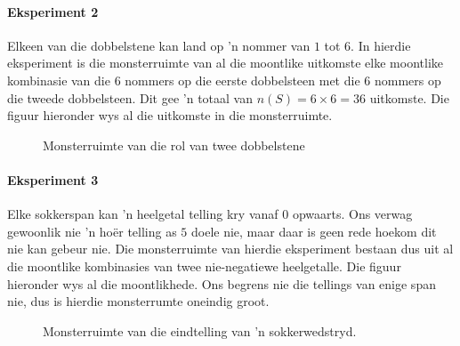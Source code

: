 \paragraph{Eksperiment 2} Elkeen van die dobbelstene kan land op 'n nommer van $1$ tot $6$. In hierdie eksperiment is die monsterruimte van al die moontlike uitkomste elke moontlike kombinasie van die $6$ nommers op die eerste dobbelsteen met die $6$ nommers op die tweede dobbelsteen. Dit gee 'n totaal van \(n(S) = 6 \times 6
= 36\) uitkomste. Die figuur hieronder wys al die uitkomste in die monsterruimte.

\begin{figure}[h]
\begin{center}
\end{center}
  \caption{Monsterruimte van die rol van twee dobbelstene}
\end{figure}

\paragraph{Eksperiment 3} Elke sokkerspan kan 'n heelgetal telling kry vanaf $0$ opwaarts. Ons verwag gewoonlik nie 'n ho\"er telling as $5$ doele nie, maar daar is geen rede hoekom dit nie kan gebeur nie. Die monsterruimte van hierdie eksperiment bestaan dus uit al die moontlike kombinasies van twee nie-negatiewe heelgetalle. Die figuur hieronder wys al die moontlikhede. Ons begrens nie die tellings van enige span nie, dus is hierdie monsterrumte oneindig groot.

\begin{figure}[h]
\begin{center}
\end{center}
  \caption{Monsterruimte van die eindtelling van 'n sokkerwedstryd.}
\end{figure}

